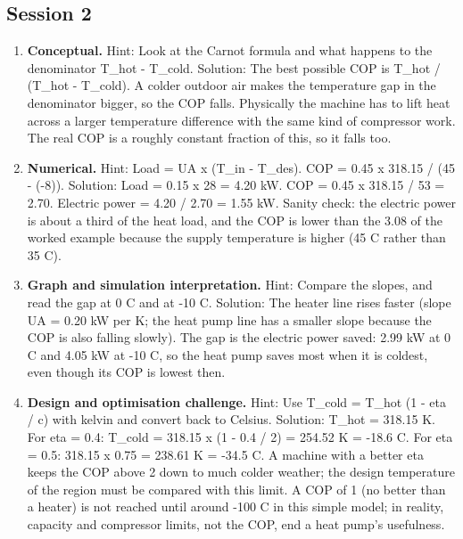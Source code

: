 \documentclass[11pt,a4paper]{article}
\begin{document}
\subsection*{Session 2}
\begin{enumerate}[nosep]
\item \textbf{Conceptual.} Hint: Look at the Carnot formula and what happens to the denominator T\_hot - T\_cold. Solution: The best possible COP is T\_hot / (T\_hot - T\_cold). A colder outdoor air makes the temperature gap in the denominator bigger, so the COP falls. Physically the machine has to lift heat across a larger temperature difference with the same kind of compressor work. The real COP is a roughly constant fraction of this, so it falls too.
\item \textbf{Numerical.} Hint: Load = UA x (T\_in - T\_des). COP = 0.45 x 318.15 / (45 - (-8)). Solution: Load = 0.15 x 28 = 4.20 kW. COP = 0.45 x 318.15 / 53 = 2.70. Electric power = 4.20 / 2.70 = 1.55 kW. Sanity check: the electric power is about a third of the heat load, and the COP is lower than the 3.08 of the worked example because the supply temperature is higher (45 C rather than 35 C).
\item \textbf{Graph and simulation interpretation.} Hint: Compare the slopes, and read the gap at 0 C and at -10 C. Solution: The heater line rises faster (slope UA = 0.20 kW per K; the heat pump line has a smaller slope because the COP is also falling slowly). The gap is the electric power saved: 2.99 kW at 0 C and 4.05 kW at -10 C, so the heat pump saves most when it is coldest, even though its COP is lowest then.
\item \textbf{Design and optimisation challenge.} Hint: Use T\_cold = T\_hot (1 - eta / c) with kelvin and convert back to Celsius. Solution: T\_hot = 318.15 K. For eta = 0.4: T\_cold = 318.15 x (1 - 0.4 / 2) = 254.52 K = -18.6 C. For eta = 0.5: 318.15 x 0.75 = 238.61 K = -34.5 C. A machine with a better eta keeps the COP above 2 down to much colder weather; the design temperature of the region must be compared with this limit. A COP of 1 (no better than a heater) is not reached until around -100 C in this simple model; in reality, capacity and compressor limits, not the COP, end a heat pump's usefulness.
\end{enumerate}
\end{document}

